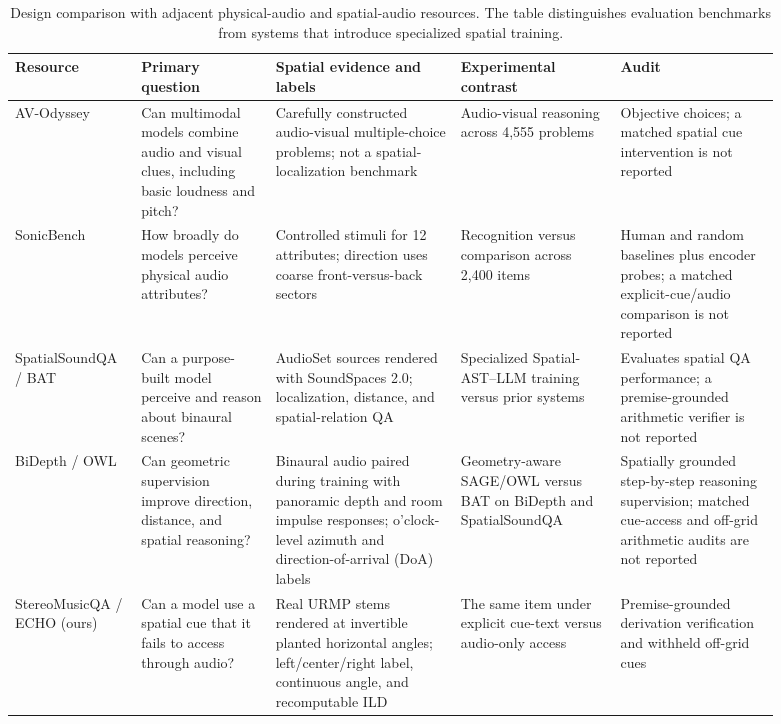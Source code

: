 \documentclass{article}
\begin{document}
\begin{table}[H]
\caption{Design comparison with adjacent physical-audio and spatial-audio resources. The table distinguishes evaluation benchmarks from systems that introduce specialized spatial training.}
\label{tab:benchmark-comparison}
\centering
\footnotesize
\setlength{\tabcolsep}{3pt}
\renewcommand{\arraystretch}{1.35}
\begin{tabular}{
>{\raggedright\arraybackslash}p{0.13\linewidth}
>{\raggedright\arraybackslash}p{0.16\linewidth}
>{\raggedright\arraybackslash}p{0.22\linewidth}
>{\raggedright\arraybackslash}p{0.19\linewidth}
>{\raggedright\arraybackslash}p{0.19\linewidth}}
\toprule
Resource & Primary question & Spatial evidence and labels & Experimental contrast & Audit \\
\midrule
AV-Odyssey \citep{gong2024avodyssey} & Can multimodal models combine audio and visual clues, including basic loudness and pitch? & Carefully constructed audio-visual multiple-choice problems; not a spatial-localization benchmark & Audio-visual reasoning across 4,555 problems & Objective choices; a matched spatial cue intervention is not reported \\ SonicBench \citep{sun2026sonicbench} & How broadly do models perceive physical audio attributes? & Controlled stimuli for 12 attributes; direction uses coarse front-versus-back sectors & Recognition versus comparison across 2,400 items & Human and random baselines plus encoder probes; a matched explicit-cue/audio comparison is not reported \\ SpatialSoundQA / BAT \citep{zheng2024bat} & Can a purpose-built model perceive and reason about binaural scenes? & AudioSet sources rendered with SoundSpaces 2.0; localization, distance, and spatial-relation QA & Specialized Spatial-AST--LLM training versus prior systems & Evaluates spatial QA performance; a premise-grounded arithmetic verifier is not reported \\ BiDepth / OWL \citep{biswas2025owl} & Can geometric supervision improve direction, distance, and spatial reasoning? & Binaural audio paired during training with panoramic depth and room impulse responses; o'clock-level azimuth and direction-of-arrival (DoA) labels & Geometry-aware SAGE/OWL versus BAT on BiDepth and SpatialSoundQA & Spatially grounded step-by-step reasoning supervision; matched cue-access and off-grid arithmetic audits are not reported \\ StereoMusicQA / ECHO (ours) & Can a model use a spatial cue that it fails to access through audio? & Real URMP stems rendered at invertible planted horizontal angles; left/center/right label, continuous angle, and recomputable ILD & The same item under explicit cue-text versus audio-only access & Premise-grounded derivation verification and withheld off-grid cues \\
\bottomrule
\end{tabular}
\end{table}
\end{document}
